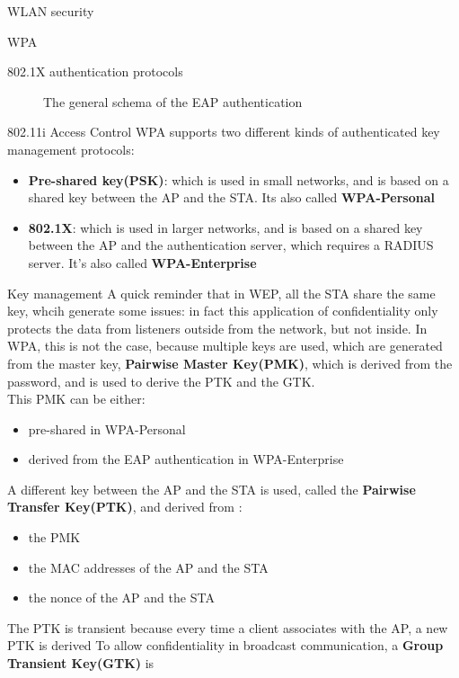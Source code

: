 \begin{section}{WLAN security}
\begin{subsection}{WPA}
\begin{subsubsection}{802.1X authentication protocols}
\begin{figure}[h]
        \caption{The general schema of the EAP authentication}
      \end{figure}
    \end{subsubsection}
    \begin{subsubsection}{802.11i Access Control}
      WPA supports two different kinds of authenticated key management protocols:
      \begin{itemize}
        \item \textbf{Pre-shared key(PSK)}: which is used in small networks, and is based on a 
          shared key between the AP and the STA. Its also called \textbf{WPA-Personal}
        \item \textbf{802.1X}: which is used in larger networks, and is based on a shared key between
          the AP and the authentication server, which requires a RADIUS server. It's also called
          \textbf{WPA-Enterprise}
      \end{itemize}
    \end{subsubsection}
    \begin{subsubsection}{Key management}
      A quick reminder that in WEP, all the STA share the same key, whcih generate some issues: in
      fact this application of confidentiality only protects the data from listeners outside from
      the network, but not inside. In WPA, this is not the case, because multiple keys are used,
      which are generated from the master key, \textbf{Pairwise Master Key(PMK)}, which
      is derived from the password, and is used to derive the PTK and the GTK.\\
      This PMK can be either:
      \begin{itemize}
        \item pre-shared in WPA-Personal
        \item derived from the EAP authentication in WPA-Enterprise
      \end{itemize}
      A different key between the AP and the STA is used, called the \textbf{Pairwise Transfer Key(PTK)},
      and derived from :
      \begin{itemize}
        \item the PMK
        \item the MAC addresses of the AP and the STA
        \item the nonce of the AP and the STA
      \end{itemize}
      The PTK is transient because every time a client associates with the AP, a new PTK is derived
      To allow confidentiality in broadcast communication, a \textbf{Group Transient Key(GTK)} is 

\end{subsubsection}
\end{subsection}
\end{section}

